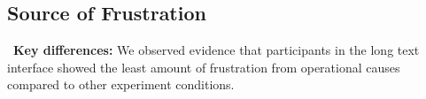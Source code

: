 





%


\subsection{Source of Frustration} 
\label{sec:fustration}

\begin{tldrbox}
   \faKey~\textbf{Key differences:} We observed evidence that participants in the long text interface showed the least amount of frustration from operational causes compared to other experiment conditions.%
\end{tldrbox}

